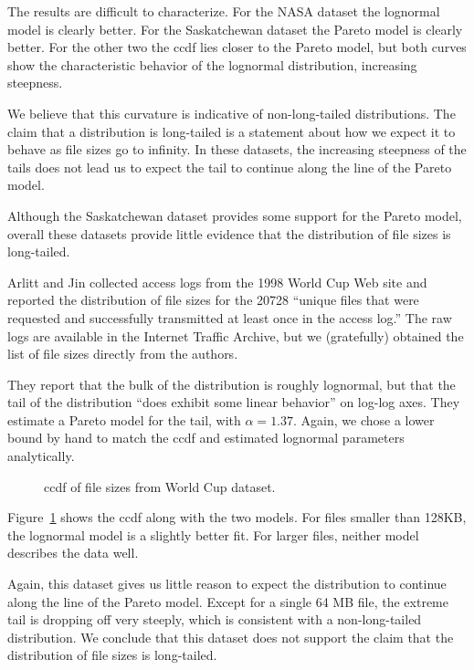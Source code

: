 \documentclass[10pt,twocolumn]{article}
\begin{document}
The results are difficult to characterize.  For the NASA dataset the
lognormal model is clearly better.  For the Saskatchewan dataset the
Pareto model is clearly better.  For the other two the ccdf lies
closer to the Pareto model, but both curves show the characteristic
behavior of the lognormal distribution, increasing steepness.

We believe that this curvature is indicative of non-long-tailed
distributions.  The claim that a distribution is long-tailed is a
statement about how we expect it to behave as file sizes go to
infinity.  In these datasets, the increasing steepness of the tails
does not lead us to expect the tail to continue along the line of the
Pareto model.

Although the Saskatchewan dataset provides some support for
the Pareto model, overall these datasets provide little
evidence that the distribution of file sizes is long-tailed.

Arlitt and Jin collected access logs from the 1998 World Cup Web site
\cite{ArlittJin99} and reported the distribution of file sizes for the
20728 ``unique files that were requested and successfully transmitted
at least once in the access log.''  The raw logs are available in the
Internet Traffic Archive, but we (gratefully) obtained the list of
file sizes directly from the authors.

They report that the bulk of the distribution is roughly
lognormal, but that the tail of the distribution ``does
exhibit some linear behavior'' on log-log axes.  They estimate
a Pareto model for the tail, with $\alpha = 1.37$.
Again, we chose a lower bound by hand to match
the ccdf and estimated lognormal parameters analytically.

\begin{figure}[tb]
\centerline{}
\caption{
ccdf of file sizes from World Cup dataset. }
\label{fig.arlitt}
\end{figure}

Figure~\ref{fig.arlitt} shows the ccdf along with the two models.  For
files smaller than 128KB, the lognormal model is a slightly better
fit.  For larger files, neither model describes the data well.

Again, this dataset gives us little reason to expect the distribution
to continue along the line of the Pareto model.  Except for a single
64 MB file, the extreme tail is dropping off very steeply, which is
consistent with a non-long-tailed distribution.  We conclude that this
dataset does not support the claim that the distribution of file sizes
is long-tailed.
\end{document}
